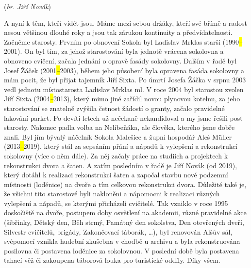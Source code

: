 (\emph{br. Jiří Novák})

A nyní k těm, kteří vidět jsou. Máme mezi sebou držáky, kteří své břímě
a radost nesou většinou dlouhé roky a jsou tak zárukou kontinuity a
předvídatelnosti. Začněme starosty. Prvním po obnovení Sokola byl
Ladislav Mrklas starší (1990\emph{\hl{--}}2001). On byl tím, za jehož
starostování byla jednotě vrácena sokolovna a obnoveno cvičení, začala
jednání o opravě fasády sokolovny. Dalším v řadě byl Josef Žáček
(2001\emph{\hl{--}}2003), během jeho působení byla opravena fasáda
sokolovny a mám pocit, že byl přijat tajemník Jiří Sixta. Po úmrtí
Josefa Žáčka v srpnu 2003 vedl jednotu místostarosta Ladislav Mrklas ml.
V roce 2004 byl starostou zvolen Jiří Sixta (2004\emph{\hl{--}}2013),
který mimo jiné zařídil novou plynovou kotelnu, za jeho starostování se
znatelně zvýšila četnost žádostí o granty, začalo pravidelné lakování
parket. Po devíti letech už nečekaně nekandidoval a my jsme řešili post
starosty. Nakonec padla volba na Nelibeňáka, ale člověka, kterého jsme
dobře znali. Byl jím bývalý náčelník Sokola Malešice a župní hospodář
Aleš Müller (2013\emph{\hl{--}}2019), který stál za sepsáním přání a
nápadů k vylepšení a rekonstrukcí sokolovny (více o něm dále). Za něj
začaly práce na studiích a projektech k rekonstrukci dvora a šaten. A
zatím posledním v řadě je Jiří Novák (od 2019), který dotáhl k realizaci
rekonstrukci šaten a započal stavbu nové podzemní místnosti (loděnice)
na dvoře a tím celkovou rekonstrukci dvora. Důležité také je, že všichni
tito starostové byli nakloněni a nápomocni k realizaci různých vylepšení
a nápadů, se kterými přicházeli cvičitelé. Tak vzniklo v roce 1995
doskočiště na dvoře, postupem doby osvětlení na akademii, různé
pravidelné akce (šibřinky, Dětský den, Běh strmý, Památný den sokolstva,
Den otevřených dveří, Silvestr cvičitelů, brigády, Zakončovací táborák,
\ldots), byl renovován Alšův sál, svépomocí vznikla hudební zkušebna v
chodbě u archivu a byla rekonstruována posilovna či postavena loděnice
za sokolovnou. V poslední době byla postavena tahací věž či zakoupena
táborová louka pro turistické oddíly. Díky všem.

